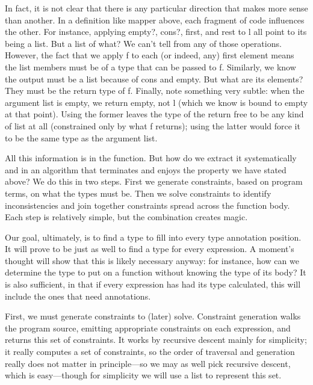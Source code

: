 In fact, it is not clear that there is any particular direction that makes more sense
than another. In a definition like mapper above, each fragment of code influences the
other. For instance, applying empty?, cons?, first, and rest to l all point to its
being a list. But a list of what? We can’t tell from any of those operations. However,
the fact that we apply f to each (or indeed, any) first element means the list members
must be of a type that can be passed to f. Similarly, we know the output must be a list
because of cons and empty. But what are its elements? They must be the return type
of f. Finally, note something very subtle: when the argument list is empty, we return
empty, not l (which we know is bound to empty at that point). Using the former
leaves the type of the return free to be any kind of list at all (constrained only by what
f returns); using the latter would force it to be the same type as the argument list.

All this information is in the function. But how do we extract it systematically and
in an algorithm that terminates and enjoys the property we have stated above? We do
this in two steps. First we generate constraints, based on program terms, on what the
types must be. Then we solve constraints to identify inconsistencies and join together
constraints spread across the function body. Each step is relatively simple, but the
combination creates magic.

\secdown
{}

Our goal, ultimately, is to find a type to fill into every type annotation position. It
will prove to be just as well to find a type for every expression. A moment’s thought
will show that this is likely necessary anyway: for instance, how can we determine the
type to put on a function without knowing the type of its body? It is also sufficient, in
that if every expression has had its type calculated, this will include the ones that need
annotations.

First, we must generate constraints to (later) solve. Constraint generation walks
the program source, emitting appropriate constraints on each expression, and returns
this set of constraints. It works by recursive descent mainly for simplicity; it really
computes a set of constraints, so the order of traversal and generation really does not
matter in principle—so we may as well pick recursive descent, which is easy—though
for simplicity we will use a list to represent this set.

